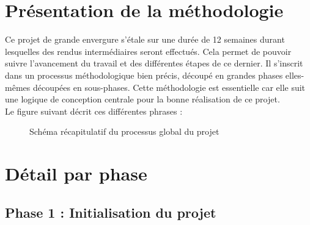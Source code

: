 \section{Présentation de la méthodologie}

Ce projet de grande envergure s’étale sur une durée de 12 semaines durant lesquelles des rendus intermédiaires seront effectués. Cela permet de pouvoir suivre l’avancement du travail et des différentes étapes de ce dernier. Il s’inscrit dans un processus méthodologique bien précis, découpé en grandes phases elles-mêmes découpées en sous-phases. Cette méthodologie est essentielle car elle suit une logique de conception centrale pour la bonne réalisation de ce projet. \\

Le figure suivant décrit ces différentes phrases :

\begin{figure}[H]
    \label{fig-LABEL-DE-LA-FIGURE}
    \noindent{}
    \caption{Schéma récapitulatif du processus global du projet}
\end{figure}

\section{Détail par phase}

\subsection{Phase 1 : Initialisation du projet}

